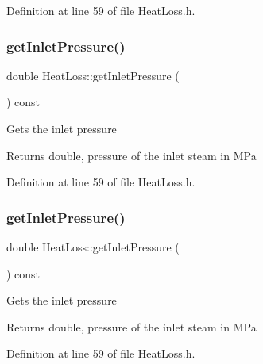 Definition at line 59 of file Heat\+Loss.\+h.

\mbox{\label{class_heat_loss_a09e6e05477fd6794ea7f42bb43da2f50}} 
\subsubsection{\texorpdfstring{get\+Inlet\+Pressure()}{getInletPressure()}\hspace{0.1cm}{\footnotesize\ttfamily [2/3]}}
{\footnotesize\ttfamily double Heat\+Loss\+::get\+Inlet\+Pressure (\begin{DoxyParamCaption}{ }\end{DoxyParamCaption}) const\hspace{0.3cm}{\ttfamily [inline]}}

Gets the inlet pressure \begin{DoxyReturn}{Returns}
double, pressure of the inlet steam in M\+Pa 
\end{DoxyReturn}


Definition at line 59 of file Heat\+Loss.\+h.

\mbox{\label{class_heat_loss_a09e6e05477fd6794ea7f42bb43da2f50}} 
\subsubsection{\texorpdfstring{get\+Inlet\+Pressure()}{getInletPressure()}\hspace{0.1cm}{\footnotesize\ttfamily [3/3]}}
{\footnotesize\ttfamily double Heat\+Loss\+::get\+Inlet\+Pressure (\begin{DoxyParamCaption}{ }\end{DoxyParamCaption}) const\hspace{0.3cm}{\ttfamily [inline]}}

Gets the inlet pressure \begin{DoxyReturn}{Returns}
double, pressure of the inlet steam in M\+Pa 
\end{DoxyReturn}


Definition at line 59 of file Heat\+Loss.\+h.

\mbox{\label{class_heat_loss_a7bea461460dbacf1855d5375bbf6c097}} 
